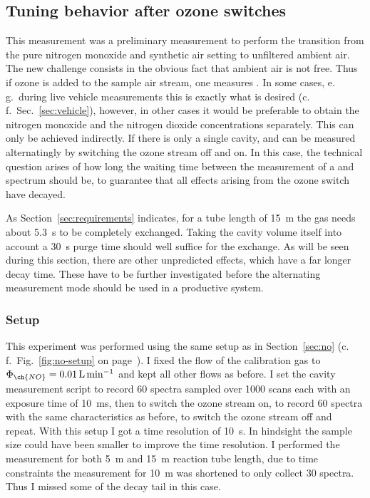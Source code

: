 \subsection{Tuning behavior after ozone switches}
\label{sec:switch}

This measurement was a preliminary measurement to perform the
transition from the pure nitrogen monoxide and synthetic air setting
to unfiltered ambient air. The new challenge consists in the obvious
fact that ambient air is not  free. Thus if ozone is added to
the sample air stream, one measures . In some
cases, e.\,g.\ during live vehicle measurements this is exactly what
is desired (c.\,f.~Sec.~\ref{sec:vehicle}), however, in other cases it
would be preferable to obtain the nitrogen monoxide and the nitrogen
dioxide concentrations separately. This can only be achieved
indirectly. If there is only a single cavity,  and 
can be measured alternatingly by switching the ozone stream off and
on. In this case, the technical question arises of how long the
waiting time between the measurement of a  and 
spectrum should be, to guarantee that all effects arising from the
ozone switch have decayed.

As Section~\ref{sec:requirements} indicates, for a tube length of
\SI{15}{\meter} the gas needs about \SI{5.3}{\second} to be completely
exchanged. Taking the cavity volume itself into account a
\SI{30}{\second} purge time should well suffice for the exchange. As
will be seen during this section, there are other unpredicted effects,
which have a far longer decay time. These have to be further
investigated before the alternating measurement mode should be used in
a productive system.

\subsubsection{Setup}
\label{sec:switch-setup}

This experiment was performed using the same setup as in
Section~\ref{sec:no} (c.\,f.\ Fig.~\ref{fig:no-setup} on
page~\pageref{fig:no-setup}). I fixed the flow of the 
calibration gas to $\Phi_{\ch{NO}} = \SI{0.01}{\liter\per\minute}$ and
kept all other flows as before. I set the cavity measurement script to
record 60 spectra sampled over 1000 scans each with an exposure time
of \SI{10}{\milli\second}, then to switch the ozone stream on, to
record 60 spectra with the same characteristics as before, to switch
the ozone stream off and repeat. With this setup I got a time
resolution of \SI{10}{\second}. In hindsight the sample size could
have been smaller to improve the time resolution. I performed the
measurement for both \SI{5}{\meter} and \SI{15}{\meter} reaction tube
length, due to time constraints the measurement for \SI{10}{\meter}
was shortened to only collect 30 spectra. Thus I missed some of the
decay tail in this case.

